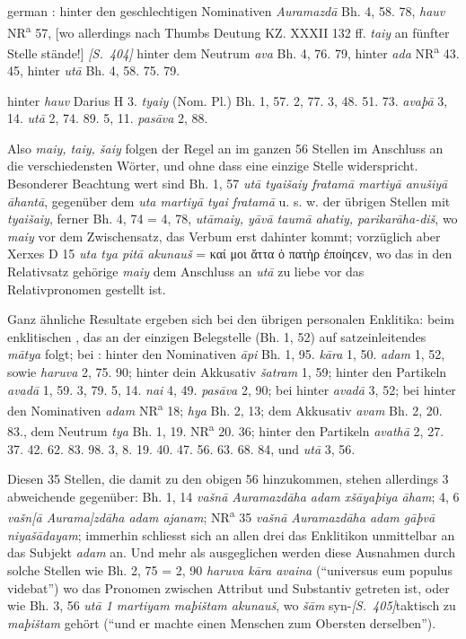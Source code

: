 \begin{otherlanguage*}{german}
\emph{}: hinter den geschlechtigen Nominativen \emph{Auramazdā} Bh. 4, 58. 78, \emph{hauv} NR\textsuperscript{a} 57, [wo allerdings nach Thumbs Deutung KZ. XXXII 132 ff. \emph{taiy} an fünfter Stelle stände!] \hypertarget{p404}{\emph{[S.~404]}}\label{p404} hinter dem Neutrum \emph{ava} Bh. 4, 76. 79, hinter \emph{ada} NR\textsuperscript{a} 43. 45, hinter \emph{utā} Bh. 4, 58. 75. 79.

\emph{} hinter \emph{hauv} Darius H 3. \emph{tyaiy} (Nom. Pl.) Bh. 1, 57. 2, 77. 3, 48. 51. 73. \emph{avaþā} 3, 14. \emph{utā} 2, 74. 89. 5, 11. \emph{pasāva} 2, 88.

Also \emph{maiy, taiy, šaiy} folgen der Regel an im ganzen 56 Stellen im Anschluss an die verschiedensten Wörter, und ohne dass eine einzige Stelle widerspricht. Besonderer Beachtung wert sind Bh. 1, 57 \emph{utā tyaišaiy fratamā martiyā anušiyā āhantā}, gegenüber dem \emph{uta martiyā tyai fratamā} u. s. w. der übrigen Stellen mit \emph{tyaišaiy}, ferner Bh. 4, 74 = 4, 78, \emph{utāmaiy, yāvā taumā ahatiy, parikarāha-diš}, wo \emph{maiy} vor dem Zwischensatz, das Verbum erst dahinter kommt; vorzüglich aber Xerxes D 15 \emph{uta tya pitā akunauš} = καί μοι ἅττα ὁ πατὴρ ἐποίηϲεν, wo das in den Relativsatz gehörige \emph{maiy} dem Anschluss an \emph{utā} zu liebe vor das Relativpronomen gestellt ist.

Ganz ähnliche Resultate ergeben sich bei den übrigen personalen Enklitika: beim enklitischen \emph{}, das an der einzigen Belegstelle (Bh. 1, 52) auf satzeinleitendes \emph{mātya} folgt; bei \emph{}: hinter den Nominativen \emph{āpi} Bh. 1, 95. \emph{kāra} 1, 50. \emph{adam} 1, 52, sowie \emph{haruva} 2, 75. 90; hinter dein Akkusativ \emph{šatram} 1, 59; hinter den Partikeln \emph{avadā} 1, 59. 3, 79. 5, 14. \emph{nai} 4, 49. \emph{pasāva} 2, 90; bei \emph{} hinter \emph{avadā} 3, 52; bei \emph{} hinter den Nominativen \emph{adam} NR\textsuperscript{a} 18; \emph{hya} Bh. 2, 13; dem Akkusativ \emph{avam} Bh. 2, 20. 83., dem Neutrum \emph{tya} Bh. 1, 19. NR\textsuperscript{a} 20. 36; hinter den Partikeln \emph{avathā} 2, 27. 37. 42. 62. 83. 98. 3, 8. 19. 40. 47. 56. 63. 68. 84, und \emph{utā} 3, 56.

Diesen 35 Stellen, die damit zu den obigen 56 hinzukommen, stehen allerdings 3 abweichende gegenüber: Bh. 1, 14 \emph{vašnā Auramazdāha adam xšāyaþiya āham}; 4, 6 \emph{vašn[ā Aurama]zdāha adam ajanam}; NR\textsuperscript{a} 35 \emph{vašnā Auramazdāha adam gāþvā niyašādayam}; immerhin schliesst sich an allen drei das Enklitikon unmittelbar an das Subjekt \emph{adam} an. Und mehr als ausgeglichen werden diese Ausnahmen durch solche Stellen wie Bh. 2, 75 = 2, 90 \emph{haruva kāra avaina} (“universus eum populus videbat”) wo das Pronomen zwischen Attribut und Substantiv getreten ist, oder wie Bh. 3, 56 \emph{utā 1 martiyam maþištam akunauš}, wo \emph{šām} syn-\hypertarget{p405}{\emph{[S.~405]}}\label{p405}taktisch zu \emph{maþištam} gehört (“und er machte einen Menschen zum Obersten derselben”).


\end{otherlanguage*}

